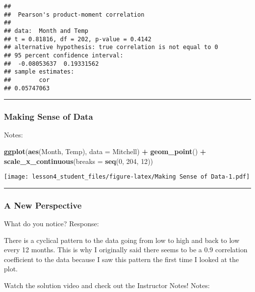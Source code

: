 \documentclass[]{article}
\newenvironment{Shaded}{\begin{snugshade}}{\end{snugshade}}
\newcommand{\KeywordTok}[1]{\textcolor[rgb]{0.13,0.29,0.53}{\textbf{#1}}}
\newcommand{\DataTypeTok}[1]{\textcolor[rgb]{0.13,0.29,0.53}{#1}}
\newcommand{\DecValTok}[1]{\textcolor[rgb]{0.00,0.00,0.81}{#1}}
\newcommand{\StringTok}[1]{\textcolor[rgb]{0.31,0.60,0.02}{#1}}
\newcommand{\OperatorTok}[1]{\textcolor[rgb]{0.81,0.36,0.00}{\textbf{#1}}}
\newcommand{\NormalTok}[1]{#1}
\begin{document}
\begin{verbatim}
## 
##  Pearson's product-moment correlation
## 
## data:  Month and Temp
## t = 0.81816, df = 202, p-value = 0.4142
## alternative hypothesis: true correlation is not equal to 0
## 95 percent confidence interval:
##  -0.08053637  0.19331562
## sample estimates:
##        cor 
## 0.05747063
\end{verbatim}

\begin{center}\rule{0.5\linewidth}{\linethickness}\end{center}

\subsubsection{Making Sense of Data}\label{making-sense-of-data}

Notes:

\begin{Shaded}
\begin{Highlighting}[]
\KeywordTok{ggplot}\NormalTok{(}\KeywordTok{aes}\NormalTok{(Month, Temp), }\DataTypeTok{data =}\NormalTok{ Mitchell) }\OperatorTok{+}
\StringTok{  }\KeywordTok{geom_point}\NormalTok{() }\OperatorTok{+}
\StringTok{  }\KeywordTok{scale_x_continuous}\NormalTok{(}\DataTypeTok{breaks =} \KeywordTok{seq}\NormalTok{(}\DecValTok{0}\NormalTok{, }\DecValTok{204}\NormalTok{, }\DecValTok{12}\NormalTok{))}
\end{Highlighting}
\end{Shaded}

\texttt{[image: lesson4\_student\_files/figure-latex/Making Sense of Data-1.pdf]}

\begin{center}\rule{0.5\linewidth}{\linethickness}\end{center}

\subsubsection{A New Perspective}\label{a-new-perspective}

What do you notice? Response:

There is a cyclical pattern to the data going from low to high and back
to low every 12 months. This is why I originally said there seems to be
a 0.9 correlation coefficient to the data because I saw this pattern the
first time I looked at the plot.

Watch the solution video and check out the Instructor Notes! Notes:
\end{document}
